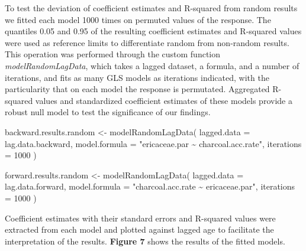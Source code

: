 \documentclass[
]{article}
\newenvironment{Shaded}{\begin{snugshade}}{\end{snugshade}}
\newcommand{\AttributeTok}[1]{\textcolor[rgb]{0.77,0.63,0.00}{#1}}
\newcommand{\DecValTok}[1]{\textcolor[rgb]{0.00,0.00,0.81}{#1}}
\newcommand{\FunctionTok}[1]{\textcolor[rgb]{0.00,0.00,0.00}{#1}}
\newcommand{\NormalTok}[1]{#1}
\newcommand{\OtherTok}[1]{\textcolor[rgb]{0.56,0.35,0.01}{#1}}
\newcommand{\StringTok}[1]{\textcolor[rgb]{0.31,0.60,0.02}{#1}}
\begin{document}
\normalsize

\newpage

To test the deviation of coefficient estimates and R-squared from random
results we fitted each model 1000 times on permuted values of the
response. The quantiles 0.05 and 0.95 of the resulting coefficient
estimates and R-squared values were used as reference limits to
differentiate random from non-random results. This operation was
performed through the custom function \emph{modelRandomLagData}, which
takes a lagged dataset, a formula, and a number of iterations, and fits
as many GLS models as iterations indicated, with the particularity that
on each model the response is permutated. Aggregated R-squared values
and standardized coefficient estimates of these models provide a robust
null model to test the significance of our findings.

\small

\begin{Shaded}
\begin{Highlighting}[]
\NormalTok{backward.results.random }\OtherTok{\textless{}{-}} \FunctionTok{modelRandomLagData}\NormalTok{(}
  \AttributeTok{lagged.data =}\NormalTok{ lag.data.backward, }
  \AttributeTok{model.formula =} \StringTok{"ericaceae.par \textasciitilde{} charcoal.acc.rate"}\NormalTok{, }
  \AttributeTok{iterations =} \DecValTok{1000}
\NormalTok{  )}

\NormalTok{forward.results.random }\OtherTok{\textless{}{-}} \FunctionTok{modelRandomLagData}\NormalTok{(}
  \AttributeTok{lagged.data =}\NormalTok{ lag.data.forward, }
  \AttributeTok{model.formula =} \StringTok{"charcoal.acc.rate \textasciitilde{} ericaceae.par"}\NormalTok{, }
  \AttributeTok{iterations =} \DecValTok{1000}
\NormalTok{  )}
\end{Highlighting}
\end{Shaded}

\normalsize

Coefficient estimates with their standard errors and R-squared values
were extracted from each model and plotted against lagged age to
facilitate the interpretation of the results. \textbf{Figure 7} shows
the results of the fitted models.
\end{document}
